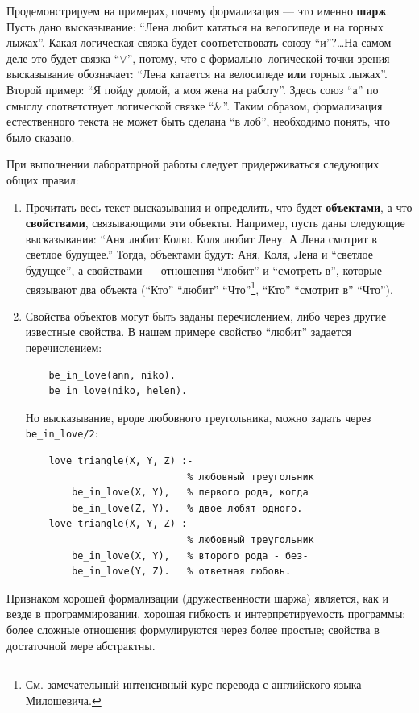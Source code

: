\documentclass[12pt, openany, oneside]{book} %
\begin{document}
Продемонстрируем на примерах, почему формализация --- это именно {\bf шарж}. Пусть дано высказывание: ``Лена любит кататься на велосипеде и на горных лыжах''. Какая логическая связка будет соответствовать союзу ``и''?\ldots На самом деле это будет связка ``$\vee$'', потому, что с формально--логической точки зрения высказывание обозначает: ``Лена катается на велосипеде {\bf или} горных лыжах''. Второй пример: ``Я пойду домой, а моя жена на работу''. Здесь союз ``а'' по смыслу соответствует логической связке ``\&''. Таким образом, формализация естественного текста не может быть сделана ``в лоб'', необходимо понять, что было сказано.

При выполнении лабораторной работы следует придерживаться следующих общих правил:
\begin{enumerate}
\item Прочитать весь текст высказывания и определить, что будет {\bf объектами}, а что {\bf свойствами}, связывающими эти объекты. Например, пусть даны следующие высказывания: ``Аня любит Колю. Коля любит Лену. А Лена смотрит в светлое будущее.'' Тогда, объектами будут: Аня, Коля, Лена и ``светлое будущее'', а свойствами --- отношения ``любит'' и ``смотреть в'', которые связывают два объекта (``Кто'' ``любит''
``Что''\footnote{См. замечательный интенсивный курс перевода с английского языка Милошевича.}, ``Кто'' ``смотрит в'' ``Что'').
\item Свойства объектов могут быть заданы перечислением, либо через другие известные свойства. В нашем примере свойство ``любит'' задается перечислением:
{\tt\begin{verbatim}
    be_in_love(ann, niko).
    be_in_love(niko, helen).
\end{verbatim}}
\noindent Но высказывание, вроде любовного треугольника, можно задать через {\tt be\_in\_love/2}:
{\tt\begin{verbatim}
    love_triangle(X, Y, Z) :-
                            % любовный треугольник
        be_in_love(X, Y),   % первого рода, когда
        be_in_love(Z, Y).   % двое любят одного.
    love_triangle(X, Y, Z) :-
                            % любовный треугольник
        be_in_love(X, Y),   % второго рода - без-
        be_in_love(Y, Z).   % ответная любовь.
\end{verbatim}}
\end{enumerate}

Признаком хорошей формализации (дружественности шаржа) является, как и везде в программировании, хорошая гибкость и интерпретируемость программы: более сложные отношения формулируются через более простые; свойства в достаточной мере абстрактны.
\end{document}
